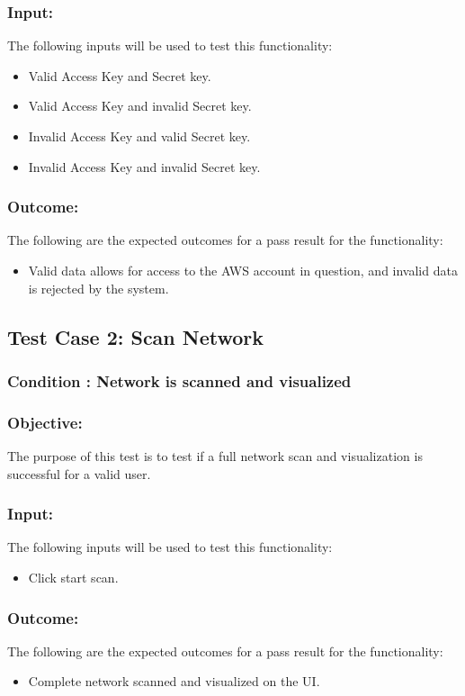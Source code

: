 \documentclass[hidelinks,a4paper,12pt]{article}
\begin{document}
\subsubsection{Input:}
 The following inputs will be used to test this functionality:
\begin{itemize}
  \item Valid Access Key and Secret key.
  \item Valid Access Key and invalid Secret key.
 \item Invalid Access Key and valid Secret key.
 \item Invalid Access Key and invalid Secret key.
\end{itemize}
\subsubsection{Outcome: }
The following are the expected outcomes for a pass result for the functionality:
\begin{itemize}
	\item Valid data allows for access to the AWS account in question, and invalid data is rejected by the system. 
\end{itemize}

\subsection{Test Case 2: Scan Network }
\subsubsection{Condition : Network is scanned and visualized}
\subsubsection{Objective:} The purpose of this test is to test if a full network scan and visualization is successful for a valid user.

\subsubsection{Input:}
 The following inputs will be used to test this functionality:
\begin{itemize}
  \item Click start scan.
\end{itemize}
\subsubsection{Outcome: }
The following are the expected outcomes for a pass result for the functionality:
\begin{itemize}
\item Complete network scanned and visualized on the UI.

\end{itemize}
\end{document}
